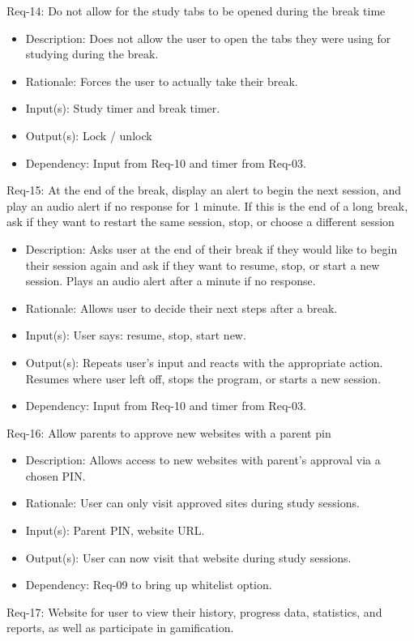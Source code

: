 \documentclass[12pt]{article}
\begin{document}
Req-14: Do not allow for the study tabs to be opened during the break time
\begin{itemize}
    \item Description: Does not allow the user to open the tabs they were using for studying during the break.
    \item Rationale: Forces the user to actually take their break.
    \item Input(s): Study timer and break timer.
    \item Output(s): Lock / unlock
    \item Dependency: Input from Req-10 and timer from Req-03.
\end{itemize}
Req-15: At the end of the break, display an alert to begin the next session, and play an audio alert if no response for 1 minute. If this is the end of a long break, ask if they want to restart the same session, stop, or choose a different session
\begin{itemize}
    \item Description:  Asks user at the end of their break if they would like to begin their session again and ask if they want to resume, stop, or start a new session. Plays an audio alert after a minute if no response.
    \item Rationale: Allows user to decide their next steps after a break.
    \item Input(s): User says: resume, stop, start new.
    \item Output(s): Repeats user’s input and reacts with the appropriate action. Resumes where user left off, stops the program, or starts a new session.
    \item Dependency:  Input from Req-10 and timer from Req-03.
\end{itemize}
Req-16: Allow parents to approve new websites with a parent pin
\begin{itemize}
    \item Description: Allows access to new websites with parent’s approval via a chosen PIN.
    \item Rationale: User can only visit approved sites during study sessions.
    \item Input(s): Parent PIN, website URL.
    \item Output(s): User can now visit that website during study sessions.
    \item Dependency: Req-09 to bring up whitelist option.
\end{itemize}
Req-17: Website for user to view their history, progress data, statistics, and reports, as well as participate in gamification.
\end{document}
